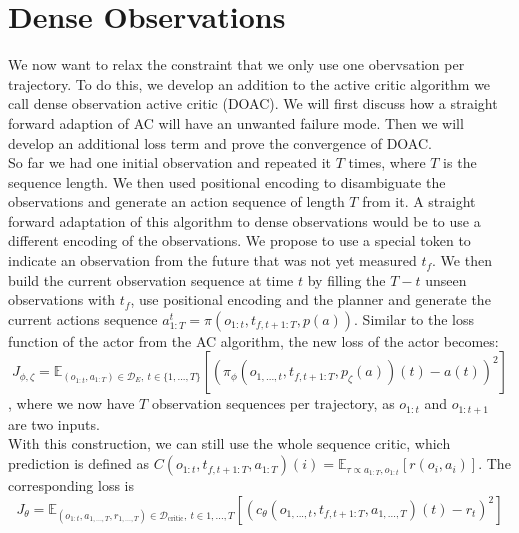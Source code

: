 \section{Dense Observations}
We now want to relax the constraint that we only use one obervsation per trajectory. To do this, we develop an addition to the active critic algorithm we call dense observation active critic (DOAC). 
We will first discuss how a straight forward adaption of AC will have an unwanted failure mode. Then we will develop an additional loss term and prove the convergence of DOAC.\\

So far we had one initial observation and repeated it $T$ times, where $T$ is the sequence length. We then used positional encoding to disambiguate the observations and generate an action sequence of 
length $T$ from it. A straight forward adaptation of this algorithm to dense observations would be to use a different encoding of the observations. We propose to use a special token to indicate an 
observation from the future that was not yet measured $t_f$. We then build the current observation sequence at time $t$ by filling the $T - t$ unseen observations with $t_f$, use positional encoding and 
the planner and 
generate the current actions sequence $a^t_{1:T} = \pi(o_{1:t}, t_{f, t+1:T}, p(a))$. Similar to the loss function of the actor from the AC algorithm, the new loss of the actor becomes: 
\begin{equation}
    \label{dense_actor_objective}
    J_{\phi, \zeta} = \mathbb{E}_{(o_{1:t}, a_{1:T}) \in \mathcal{D}_E,\ t \in \{1, ..., T\}}\left[\left( \pi_{\phi}(o_{1, ..., t}, t_{f, t+1:T}, p_{\zeta}(a))(t) - a(t)\right)^2\right]
\end{equation}
, where we now have $T$ observation sequences per trajectory, as $o_{1:t}$ and $o_{1:t+1}$ are two inputs.\\
With this construction, we can still use the whole sequence critic, 
which prediction is defined as $C(o_{1:t}, t_{f, t+1:T}, a_{1:T})(i) = \mathbb{E}_{\tau \propto a_{1:T}, o_{1:t}}\left[r(o_i, a_i)\right]$. The corresponding loss is
\begin{equation}
    J_{\theta} = \mathbb{E}_{(o_{1:t}, a_{1,...,T}, r_{1,...,T}) \in \mathcal{D}_{\text{critic}},\ t \in {1, ..., T}}\left[(c_{\theta}(o_{1, ..., t}, t_{f, t+1:T},  a_{1,...,T})(t) - r_t)^2\right]
\end{equation}

